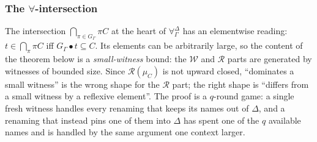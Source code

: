 \documentclass{article}
\theoremstyle{definition}
\newcommand{\cR}{\mathcal{R}}
\newcommand{\cW}{\mathcal{W}}
\begin{document}
\subsubsection*{The $\forall$-intersection}

The intersection $\bigcap_{\pi\in G_\Gamma}\pi C$ at the heart of $\forall^\Delta_\Gamma$ has an elementwise reading: $t\in\bigcap_\pi\pi C$ iff $G_\Gamma\bullet t\subseteq C$. Its elements can be arbitrarily large, so the content of the theorem below is a {\it small-witness} bound: the $\cW$ and $\cR$ parts are generated by witnesses of bounded size. Since $\cR(\mu_C)$ is not upward closed, ``dominates a small witness'' is the wrong shape for the $\cR$ part; the right shape is ``differs from a small witness by a reflexive element''. The proof is a $q$-round game: a single fresh witness handles every renaming that keeps its names out of $\Delta$, and a renaming that instead pins one of them into $\Delta$ has spent one of the $q$ available names and is handled by the same argument one context larger.
\end{document}
